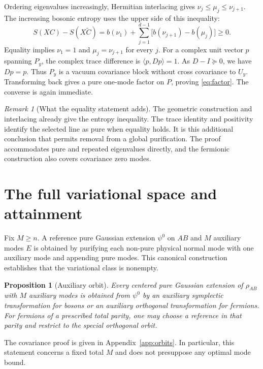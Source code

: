\documentclass[11pt,a4paper]{article}
\numberwithin{equation}{section}
\newtheorem{proposition}[theorem]{Proposition}
\theoremstyle{remark}
\newtheorem{remark}[theorem]{Remark}
\begin{document}
Ordering eigenvalues increasingly, Hermitian interlacing gives $\nu_j\le\mu_j\le\nu_{j+1}$. The increasing bosonic entropy uses the upper side of this inequality:
\begin{equation}\label{eq:boson-difference}
 S(XC)-S(X\widetilde C)
 =b(\nu_1)+\sum_{j=1}^{d-1}\bigl[b(\nu_{j+1})-b(\mu_j)\bigr]\ge0.
\end{equation}
Equality implies $\nu_1=1$ and $\mu_j=\nu_{j+1}$ for every $j$. For a complex unit vector $p$ spanning $P_y$, the complex trace difference is $\langle p,Dp\rangle=1$. As $D-I\succeq0$, we have $Dp=p$. Thus $P_y$ is a vacuum covariance block without cross covariance to $U_y$. Transforming back gives a pure one-mode factor on $P$, proving \eqref{eq:factor}. The converse is again immediate.

\begin{remark}[What the equality statement adds]
The geometric construction and interlacing already give the entropy inequality. The trace identity and positivity identify the selected line as pure when equality holds. It is this additional conclusion that permits removal from a global purification. The proof accommodates pure and repeated eigenvalues directly, and the fermionic construction also covers covariance zero modes.
\end{remark}

\section{The full variational space and attainment}\label{sec:attainment}
Fix $M\ge n$. A reference pure Gaussian extension $\psi^0$ on $AB$ and $M$ auxiliary modes $E$ is obtained by purifying each non-pure physical normal mode with one auxiliary mode and appending pure modes. This canonical construction establishes that the variational class is nonempty.

\begin{proposition}[Auxiliary orbit]\label{prop:orbit}
Every centered pure Gaussian extension of $\rho_{AB}$ with $M$ auxiliary modes is obtained from $\psi^0$ by an auxiliary symplectic transformation for bosons or an auxiliary orthogonal transformation for fermions. For fermions of a prescribed total parity, one may choose a reference in that parity and restrict to the special orthogonal orbit.
\end{proposition}
The covariance proof is given in Appendix~\ref{app:orbits}. In particular, this statement concerns a fixed total $M$ and does not presuppose any optimal mode bound.
\end{document}
